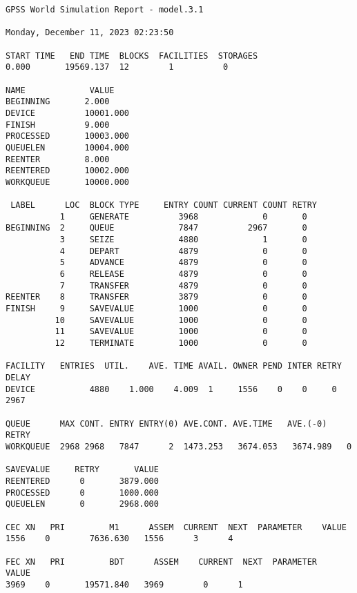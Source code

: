 \begin{lstlisting}[label=lst:2,caption=Результат работы разработанной программы на проценте возврата 80\%]
GPSS World Simulation Report - model.3.1

Monday, December 11, 2023 02:23:50

START TIME   END TIME  BLOCKS  FACILITIES  STORAGES
0.000       19569.137  12        1          0

NAME             VALUE
BEGINNING       2.000
DEVICE          10001.000
FINISH          9.000
PROCESSED       10003.000
QUEUELEN        10004.000
REENTER         8.000
REENTERED       10002.000
WORKQUEUE       10000.000

 LABEL      LOC  BLOCK TYPE     ENTRY COUNT CURRENT COUNT RETRY
           1     GENERATE          3968             0       0
BEGINNING  2     QUEUE             7847          2967       0
           3     SEIZE             4880             1       0
           4     DEPART            4879             0       0
           5     ADVANCE           4879             0       0
           6     RELEASE           4879             0       0
           7     TRANSFER          4879             0       0
REENTER    8     TRANSFER          3879             0       0
FINISH     9     SAVEVALUE         1000             0       0
          10     SAVEVALUE         1000             0       0
          11     SAVEVALUE         1000             0       0
          12     TERMINATE         1000             0       0

FACILITY   ENTRIES  UTIL.    AVE. TIME AVAIL. OWNER PEND INTER RETRY DELAY
DEVICE           4880    1.000    4.009  1     1556    0    0     0  2967

QUEUE      MAX CONT. ENTRY ENTRY(0) AVE.CONT. AVE.TIME   AVE.(-0) RETRY
WORKQUEUE  2968 2968   7847      2  1473.253   3674.053   3674.989   0

SAVEVALUE     RETRY       VALUE
REENTERED      0       3879.000                            
PROCESSED      0       1000.000                            
QUEUELEN       0       2968.000                            

CEC XN   PRI         M1      ASSEM  CURRENT  NEXT  PARAMETER    VALUE
1556    0        7636.630   1556      3      4

FEC XN   PRI         BDT      ASSEM    CURRENT  NEXT  PARAMETER    VALUE
3969    0       19571.840   3969        0      1
\end{lstlisting}

